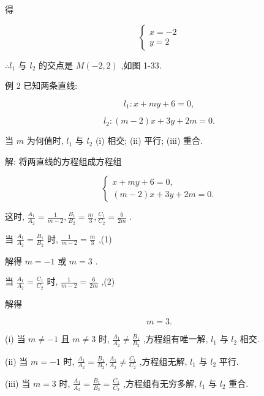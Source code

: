 \documentclass[lang=cn,newtx,12pt,scheme=chinese]{elegantbook}
\begin{document}
得

\[
  \left\{ \begin{array}{l} x = - 2 \\ y = 2 \end{array}\right.
\]

\(\therefore {l}_{1}\) 与 \({l}_{2}\) 的交点是 \(M\left( {-2,2}\right)\) ,如图 1-33.

例 2 已知两条直线:

\[
    {l}_{1} : x + {my} + 6 = 0,
\]

\[
    {l}_{2} : \left( {m - 2}\right) x + {3y} + {2m} = 0.
\]

当 \(m\) 为何值时, \({l}_{1}\) 与 \({l}_{2}\) (i) 相交; (ii) 平行; (iii) 重合.

解: 将两直线的方程组成方程组

\[
  \left\{ \begin{array}{l} x + {my} + 6 = 0, \\ \left( {m - 2}\right) x + {3y} + {2m} = 0. \end{array}\right.
\]

这时, \(\frac{{A}_{1}}{{A}_{2}} = \frac{1}{m - 2},\frac{{B}_{1}}{{B}_{2}} = \frac{m}{3},\frac{{C}_{1}}{{C}_{2}} = \frac{6}{2m}\) .

当 \(\frac{{A}_{1}}{{A}_{2}} = \frac{{B}_{1}}{{B}_{2}}\) 时, \(\frac{1}{m - 2} = \frac{m}{3}\) ,(1)

解得 \(m = - 1\) 或 \(m = 3\) .

当 \(\frac{{A}_{1}}{{A}_{2}} = \frac{{C}_{1}}{{C}_{2}}\) 时, \(\frac{1}{m - 2} = \frac{6}{2m}\) ,(2)

解得

\[
  m = 3\text{.}
\]

(i) 当 \(m \neq - 1\) 且 \(m \neq 3\) 时, \(\frac{{A}_{1}}{{A}_{2}} \neq \frac{{B}_{1}}{{B}_{2}}\) ,方程组有唯一解, \({l}_{1}\) 与 \({l}_{2}\) 相交.

(ii) 当 \(m = - 1\) 时, \(\frac{{A}_{1}}{{A}_{2}} = \frac{{B}_{1}}{{B}_{2}},\frac{{A}_{1}}{{A}_{2}} \neq \frac{{C}_{1}}{{C}_{2}}\) ,方程组无解, \({l}_{1}\) 与 \({l}_{2}\) 平行.

(iii) 当 \(m = 3\) 时, \(\frac{{A}_{1}}{{A}_{2}} = \frac{{B}_{1}}{{B}_{2}} = \frac{{C}_{1}}{{C}_{2}}\) ,方程组有无穷多解, \({l}_{1}\) 与 \({l}_{2}\) 重合.
\end{document}
